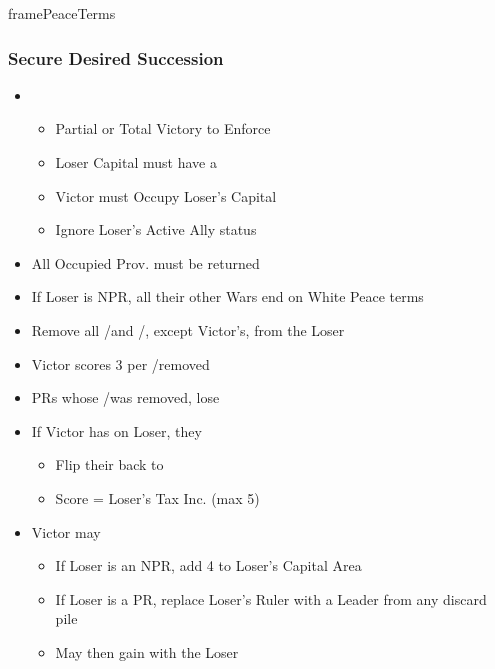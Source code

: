 \documentclass[10pt]{article}
\begin{document}
\begin{dynamiccontents*}{framePeaceTerms}
\begin{multicols}{3}
		\subsubsection*{Secure Desired Succession}
		\begin{itemize}
			\item {}
			\begin{itemize}
				\item Partial or Total Victory to Enforce
				\item Loser Capital must have a \disputedsuccession
				\item Victor must Occupy Loser's Capital
				\item Ignore Loser's Active Ally status
			\end{itemize}
			\item All Occupied Prov. must be returned
			\item If Loser is NPR, all their other Wars end on White Peace terms
			\item Remove all \marriage/\disputedsuccession and \alliance/\activeally, except Victor's, from the Loser
			\item Victor scores 3 per \marriage/\disputedsuccession removed
			\item PRs whose \marriage/\disputedsuccession was removed, lose 
			\item If Victor has \disputedsuccession on Loser, they
			\begin{itemize}
				\item Flip their \disputedsuccession back to \marriage
				\item Score \prestige = Loser's Tax Inc. (max 5)
			\end{itemize}
			\item Victor may
			\begin{itemize}
				\item If Loser is an NPR, add 4 \influence to Loser's Capital Area
				\item If Loser is a PR, replace Loser's Ruler with a Leader from any discard pile
				\item May then gain \alliance with the Loser
			\end{itemize}
		\end{itemize}


\end{multicols}
\end{dynamiccontents*}
\end{document}
